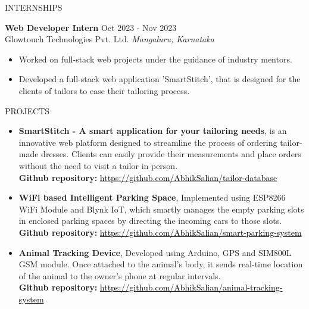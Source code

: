 \documentclass{resume} %
\begin{document}
\begin{rSection}{INTERNSHIPS}

\textbf{Web Developer Intern} \hfill Oct 2023 - Nov 2023\\
Glowtouch Technologies Pvt. Ltd. \hfill \textit{Mangaluru, Karnataka}
 \begin{itemize}
    \itemsep -3pt {} 
     \item Worked on full-stack web projects under the guidance of industry mentors.
    \item Developed a full-stack web application 'SmartStitch', that is designed for the clients of tailors to ease their tailoring process. 
 \end{itemize}
 


\end{rSection} 


\begin{rSection}{PROJECTS}
\begin{itemize}
\item \textbf{SmartStitch - A smart application for your tailoring needs}{, is an innovative web platform designed to streamline the process of ordering tailor-made dresses. Clients can easily provide their measurements and place orders without the need to visit a tailor in person.\\
\textbf{Github repository: }\href{https://github.com/AbhikSalian/tailor-database}{\textcolor{black}{https://github.com/AbhikSalian/tailor-database}}}
\item \textbf{WiFi based Intelligent Parking Space}{, Implemented using ESP8266 WiFi Module and Blynk IoT, which smartly manages the empty parking slots in enclosed parking spaces by directing the incoming cars to those slots.\\
\textbf{Github repository: }\href{https://github.com/AbhikSalian/smart-parking-system}{\textcolor{black}{https://github.com/AbhikSalian/smart-parking-system}}}
\item \textbf{Animal Tracking Device}{, Developed using Arduino, GPS and SIM800L GSM module. Once attached to the animal's body, it sends real-time location of the animal to the owner's phone at regular intervals.\\
\textbf{Github repository: }\href{https://github.com/AbhikSalian/animal-tracking-system}{\textcolor{black}{https://github.com/AbhikSalian/animal-tracking-system}}}
\end{itemize}

\end{rSection} 
\end{document}
